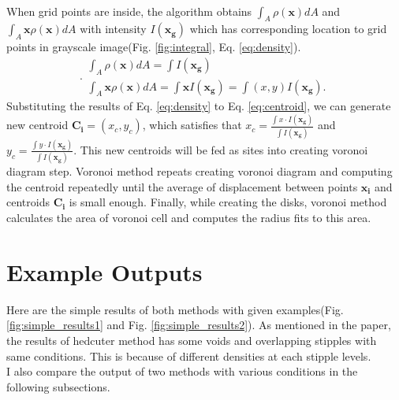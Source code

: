 \documentclass[11pt]{article}
\begin{document}
\\When grid points are inside, the algorithm obtains $\int_{A}\rho(\mathbf{x})dA$ and $\int_{A}\mathbf{x}\rho(\mathbf{x})dA$ with intensity $I(\mathbf{x_g})$ which has corresponding location to grid points in grayscale image(Fig. \ref{fig:integral}, Eq. \ref{eq:density}).
\begin{equation}\label{eq:density} .
\begin{gathered}
\int_{A}\rho(\mathbf{x})dA=\int I(\mathbf{x_g})\\
\int_{A}\mathbf{x}\rho(\mathbf{x})dA=\int \mathbf{x}I(\mathbf{x_g})=\int (x, y)I(\mathbf{x_g}).
\end{gathered}
\end{equation}
Substituting the results of Eq. \ref{eq:density} to Eq. \ref{eq:centroid}, we can generate new centroid $\mathbf{C_i}=(x_c, y_c)$,
which satisfies that $x_c=\frac{\int x\cdot I(\mathbf{x_g})}{\int I(\mathbf{x_g})}$ and $y_c=\frac{\int y\cdot I(\mathbf{x_g})}{\int I(\mathbf{x_g})}$.
This new centroids will be fed as sites into creating voronoi diagram step. Voronoi method repeats creating voronoi diagram and computing the centroid repeatedly until the average of displacement between points $\mathbf{x_i}$ and centroids $\mathbf{C_i}$ is small enough.
Finally, while creating the disks, voronoi method calculates the area of voronoi cell and computes the radius fits to this area. 
\section{Example Outputs}\label{outputs}
Here are the simple results of both methods with given examples(Fig. \ref{fig:simple_results1} and Fig. \ref{fig:simple_results2}). As mentioned in the paper\cite{secord02}, the results of hedcuter method has some voids and overlapping stipples with same conditions. This is because of different densities at each stipple levels. \\
I also compare the output of two methods with various conditions in the following subsections. 
\end{document}
